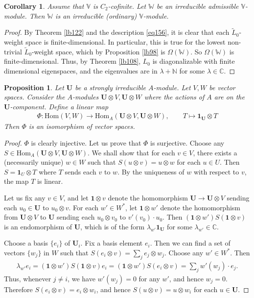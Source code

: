 \documentclass[12pt,a4paper,notitlepage]{report}
\theoremstyle{definition}
\theoremstyle{plain}
\newtheorem{pp}[df]{Proposition}
\newtheorem{co}[df]{Corollary}
\newcommand{\wtd}{\widetilde}
\newcommand{\id}{\mathbf{1}}
\newcommand{\Hom}{\mathrm{Hom}}
\newcommand{\mbf}{\mathbf}
\newcommand{\Vbb}{\mathbb V}
\newcommand{\Wbb}{\mathbb W}
\newcommand{\Cbb}{\mathbb C}
\newcommand{\Nbb}{\mathbb N}
\numberwithin{equation}{section}
\begin{document}
\begin{co}\label{lb99}
Assume that $\Vbb$ is $C_2$-cofinite. Let $\Wbb$ be an irreducible  admissible $\Vbb$-module. Then $\Wbb$ is an irreducible (ordinary) $\Vbb$-module.
\end{co}


\begin{proof}
By Theorem \ref{lb122} and the description \eqref{eq156}, it is clear that each $\wtd L_0$-weight space is finite-dimensional. In particular, this is true for the lowest non-trivial $\wtd L_0$-weight space, which by Proposition \ref{lb98} is $\Omega(\Wbb)$. So $\Omega(\Wbb)$ is finite-dimensional. Thus, by Theorem \ref{lb108}, $L_0$ is diagonalizable with finite dimensional eigenspaces, and the eigenvalues are in $\lambda+\Nbb$ for some $\lambda\in\Cbb$.
\end{proof}




\begin{pp}\label{lb115}
Let $\mbf U$ be a strongly irreducible $A$-module. Let $V,W$ be  vector spaces. Consider the $A$-modules $\mbf U\otimes V,\mbf U\otimes W$ where the actions of $A$ are on the $\mbf U$-component. Define a linear  map
\begin{align*}
\Phi:\Hom(V,W)\rightarrow \Hom_A(\mbf U\otimes V,\mbf U\otimes W),\qquad T\mapsto \id_{\mbf U}\otimes T
\end{align*}
Then $\Phi$ is an isomorphism of vector spaces.
\end{pp}
\begin{proof}	$\Phi$ is clearly injective. Let us prove that $\Phi$ is surjective. Choose any $S\in\Hom_A(\mbf U\otimes V,\mbf U\otimes W)$. We shall show that for each $v\in V$, there exists a (necessarily unique) $w\in W$ such that $S(u\otimes v)=u\otimes w$ for each $u\in U$. Then $S=\id_U\otimes T$ where $T$ sends each $v$ to $w$. By the uniqueness of $w$ with respect to $v$, the map $T$ is linear.

Let us fix any $v\in V$, and let $\id\otimes v$ denote the homomorphism $\mbf U\rightarrow\mbf U\otimes V$ sending each $u_0\in\mbf U$ to $u_0\otimes v$. For each $w'\in W^*$, let $\id\otimes w'$ denote the homomorphism from $\mbf U\otimes V$ to $\mbf U$ sending each $u_0\otimes v_0$ to $v'(v_0)\cdot u_0$. Then $(\id\otimes w')S(\id\otimes v)$ is an endomorphism of $\mbf U$, which is of the form $\lambda_{w'}\id_{\mbf U}$ for some $\lambda_{w'}\in \Cbb$. 
	
Choose a basis $\{e_i\}$ of $\mbf U_i$. Fix a basis element $e_i$. Then we can find a set of vectors $\{w_j\}$ in $W$ such that $S(e_i\otimes v)=\sum_j e_j\otimes w_j$. Choose any $w'\in W^*$. Then
	\begin{align*}
	\lambda_{w'}e_i=(\id\otimes w')S(\id\otimes v)e_i=(\id\otimes w')S(e_i\otimes v)=\sum_j w'(w_j)\cdot e_j.
	\end{align*}
	Thus, whenever $j\neq i$, we have $w'(w_j)=0$ for any $w'$, and hence $w_j=0$. Therefore $S(e_i\otimes v)=e_i\otimes w_i$, and hence $S(u\otimes v)=u\otimes w_i$ for each $u\in\mbf U$. 
\end{proof}
\end{document}
